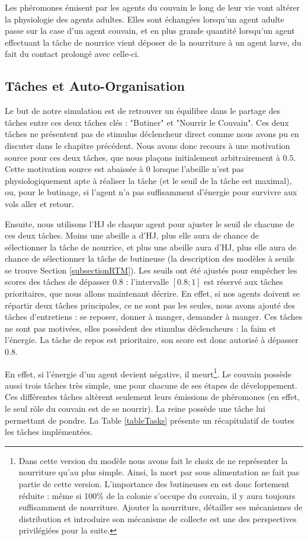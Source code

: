 			Les phéromones émisent par les agents du couvain le long de leur vie vont altérer la physiologie des agents adultes. Elles sont échangées lorsqu'un agent adulte passe sur la case d'un agent couvain, et en plus grande quantité lorsqu'un agent effectuant la tâche de nourrice vient déposer de la nourriture à un agent larve, du fait du contact prolongé avec celle-ci.
		
	\subsection{Tâches et Auto-Organisation}
		Le but de notre simulation est de retrouver un équilibre dans le partage des tâches entre ces deux tâches clés : "Butiner" et "Nourrir le Couvain". Ces deux tâches ne présentent pas de stimulus déclencheur direct comme nous avons pu en discuter dans le chapitre précédent. Nous avons donc recours à une motivation source pour ces deux tâches, que nous plaçons initialement arbitrairement à $0.5$. Cette motivation source est abaissée à 0 lorsque l'abeille n'est pas physiologiquement apte à réaliser la tâche (et le seuil de la tâche est maximal), ou, pour le butinage, si l'agent n'a pas suffisamment d'énergie pour survivre aux vols aller et retour. 
		
		Ensuite, nous utilisons l'HJ de chaque agent pour ajuster le seuil de chacune de ces deux tâches. Moins une abeille a d'HJ, plus elle aura de chance de sélectionner la tâche de nourrice, et plus une abeille aura d'HJ, plus elle aura de chance de sélectionner la tâche de butineuse (la description des modèles à seuils se trouve Section \ref{subsectionRTM}). Les seuils ont été ajustés pour empêcher les scores des tâches de dépasser $0.8$ : l'intervalle $[0.8 ; 1]$ est réservé aux tâches prioritaires, que nous allons maintenant décrire. En effet, si nos agents doivent se répartir deux tâches principales, ce ne sont pas les seules, nous avons ajouté des tâches d'entretiens : se reposer, donner à manger, demander à manger. Ces tâches ne sont pas motivées, elles possèdent des stimulus déclencheurs : la faim et l'énergie. La tâche de repos est prioritaire, son score est donc autorisé à dépasser $0.8$. 
		
		En effet, si l'énergie d'un agent devient négative, il meurt\footnote{Dans cette version du modèle nous avons fait le choix de ne représenter la nourriture qu'au plus simple. Ainsi, la mort par sous alimentation ne fait pas partie de cette version. L'importance des butineuses en est donc fortement réduite : même si 100\% de la colonie s'occupe du couvain, il y aura toujours suffisamment de nourriture. Ajouter la nourriture, détailler ses mécanismes de distribution et introduire son mécanisme de collecte est une des perspectives privilégiées pour la suite.}. Le couvain possède aussi trois tâches très simple, une pour chacune de ses étapes de développement. Ces différentes tâches altèrent seulement leurs émissions de phéromones (en effet, le seul rôle du couvain est de se nourrir). La reine possède une tâche lui permettant de pondre. La Table \ref{tableTasks} présente un récapitulatif de toutes les tâches implémentées.
		
